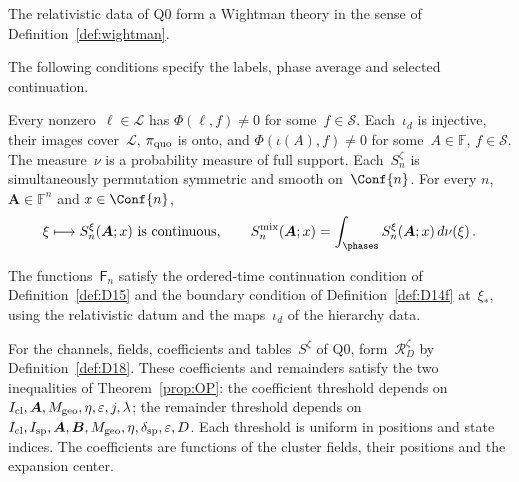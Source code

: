 \begin{definition}\label{def:Q2}
The relativistic data of Q0 form a Wightman theory in the sense of Definition~\ref{def:wightman}.
\end{definition}

The following conditions specify the labels, phase average and selected continuation.

\begin{definition}\label{def:Q3}
Every nonzero~$\ell\in\mathcal L$ has $\Phi(\ell,f)\ne0$ for some~$f\in\mathcal S$. Each~$\iota_d$ is injective, their images cover~$\mathcal L$, $\pi_{\rm quo}$ is onto, and $\Phi(\iota(A),f)\ne0$ for some~$A\in\mathbb F$, $f\in\mathcal S$. The measure~$\nu$ is a probability measure of full support. Each~$S_n^\zeta$ is simultaneously permutation symmetric and smooth on~$\Conf{n}$. For every $n$, $\boldsymbol A\in\mathbb F^n$ and $x\in\Conf{n}$,
\begin{equation*}
\xi\longmapsto S_n^\xi(\boldsymbol A;x)\text{ is continuous},\qquad
S_n^{\rm mix}(\boldsymbol A;x)=\int_{\phases}S_n^\xi(\boldsymbol A;x)\,d\nu(\xi)\,.
\end{equation*}
\end{definition}

\begin{definition}\label{def:Q4}
The functions~$\mathsf F_n$ satisfy the ordered-time continuation condition of Definition~\ref{def:D15} and the boundary condition of Definition~\ref{def:D14f} at~$\xi_*$, using the relativistic datum and the maps~$\iota_d$ of the hierarchy data.
\end{definition}

\begin{definition}[Q5. Products]\label{def:Q5}
For the channels, fields, coefficients and tables~$S^\zeta$ of Q0, form~$\mathcal R_D^\zeta$ by Definition~\ref{def:D18}. These coefficients and remainders satisfy the two inequalities of Theorem~\ref{prop:OP}: the coefficient threshold depends on $I_{\rm cl},\boldsymbol A,M_{\rm geo},\eta,\varepsilon,j,\lambda$; the remainder threshold depends on $I_{\rm cl},I_{\rm sp},\boldsymbol A,\boldsymbol B,M_{\rm geo},\eta,\delta_{\rm sp},\varepsilon,D$. Each threshold is uniform in positions and state indices. The coefficients are functions of the cluster fields, their positions and the expansion center.
\end{definition}

